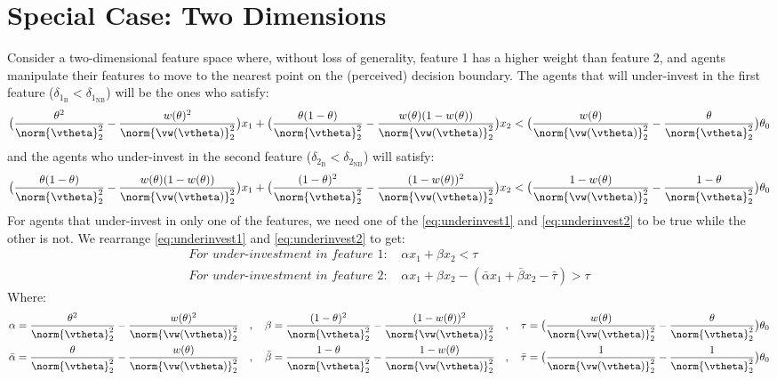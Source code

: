 \section{Special Case: Two Dimensions}\label{sec:special2D}
Consider a two-dimensional feature space where, without loss of generality, feature 1 has a higher weight than feature 2, and agents manipulate their features to move to the nearest point on the (perceived) decision boundary. The agents that will under-invest in the first feature ($\delta_{1_\text{B}}<\delta_{1_\text{NB}}$) will be the ones who satisfy:
 \begin{align}\label{eq:underinvest1}
     \big( \frac{\theta^2}{\norm{\vtheta}_2^2} - \frac{w(\theta)^2}{\norm{\vw(\vtheta)}_2^2} \big)x_1 + \big( \frac{\theta(1-\theta)}{\norm{\vtheta}_2^2} - \frac{w(\theta)(1-w(\theta))}{\norm{\vw(\vtheta)}_2^2} \big)x_2 < \big(\frac{w(\theta)}{\norm{\vw(\vtheta)}_2^2} - \frac{\theta}{\norm{\vtheta}_2^2} \big)\theta_0
 \end{align}
 and the agents who under-invest in the second feature ($\delta_{2_\text{B}}<\delta_{2_\text{NB}}$) will satisfy:
 \begin{align}\label{eq:underinvest2}
     \big( \frac{\theta(1-\theta)}{\norm{\vtheta}_2^2} - \frac{w(\theta)(1-w(\theta))}{\norm{\vw(\vtheta)}_2^2} \big)x_1 + \big( \frac{(1-\theta)^2}{\norm{\vtheta}_2^2} - \frac{(1-w(\theta))^2}{\norm{\vw(\vtheta)}_2^2} \big)x_2 < \big(\frac{1-w(\theta)}{\norm{\vw(\vtheta)}_2^2} - \frac{1-\theta}{\norm{\vtheta}_2^2} \big)\theta_0
 \end{align}
For agents that under-invest in only one of the features, we need one of the \eqref{eq:underinvest1} and \eqref{eq:underinvest2} to be true while the other is not. We rearrange \eqref{eq:underinvest1} and \eqref{eq:underinvest2} to get:
\begin{align}
    \textit{For under-investment in feature 1: }&\alpha x_1 + \beta x_2 < \tau\\
    \textit{For under-investment in feature 2: }&\alpha x_1 + \beta x_2 - (\bar\alpha x_1 + \bar\beta x_2 - \bar\tau) > \tau
\end{align}
Where:
\begin{align}
    &\alpha = \frac{\theta^2}{\norm{\vtheta}_2^2} - \frac{w(\theta)^2}{\norm{\vw(\vtheta)}_2^2}\quad,\quad \beta = \frac{(1-\theta)^2}{\norm{\vtheta}_2^2} - \frac{(1-w(\theta))^2}{\norm{\vw(\vtheta)}_2^2}\quad,\quad \tau = \big(\frac{w(\theta)}{\norm{\vw(\vtheta)}_2^2} - \frac{\theta}{\norm{\vtheta}_2^2} \big)\theta_0 \notag\\
    &\bar\alpha = \frac{\theta}{\norm{\vtheta}_2^2} - \frac{w(\theta)}{\norm{\vw(\vtheta)}_2^2}\quad,\quad \bar\beta = \frac{1-\theta}{\norm{\vtheta}_2^2} - \frac{1-w(\theta)}{\norm{\vw(\vtheta)}_2^2}\quad,\quad \bar\tau = \big(\frac{1}{\norm{\vw(\vtheta)}_2^2} - \frac{1}{\norm{\vtheta}_2^2} \big)\theta_0\notag
\end{align}
